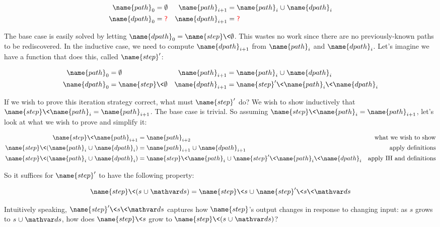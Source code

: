 \begin{align*}
  \name{path}_0 &= \emptyset
  &
  \name{path}_{i+1} &= \name{path}_i \cup \name{dpath}_i
  \\
  \name{dpath}_0 &= \textsf{\color{red}?} & \name{dpath}_{i+1} &= \textsf{\color{red}?}
\end{align*}

\noindent
The base case is easily solved by letting $\name{dpath}_0 = \name{step}\<\emptyset$. This wastes no work since there are no previously-known paths to be rediscovered. In the inductive case, we need to compute $\name{dpath}_{i+1}$ from $\name{path}_i$ and $\name{dpath}_i$. Let's imagine we have a function that does this, called $\name{step}'$:

\begin{align*}
  \name{path}_0 &= \emptyset
  &
  \name{path}_{i+1} &= \name{path}_i \cup \name{dpath}_i\\
  \name{dpath}_0 &= \name{step}\<\emptyset
  &
  \name{dpath}_{i+1} &= \name{step}' \<\name{path}_i \<\name{dpath}_i
\end{align*}

\noindent
If we wish to prove this iteration strategy correct, what must $\name{step}'$ do?
%
We wish to show inductively that $\name{step}\<\name{path}_i = \name{path}_{i+1}$.
%
The base case is trivial. So assuming $\name{step}\<\name{path}_{i} = \name{path}_{i+1}$, let's look at what we wish to prove and simplify it:

\begin{align*}
  \name{step} \<\name{path}_{i+1}
  &=
  \name{path}_{i+2}
  & \text{what we wish to show}
  \\
  \name{step} \<(\name{path}_i \cup \name{dpath}_i)
  &=
  \name{path}_{i+1} \cup \name{dpath}_{i+1}
  & \text{apply definitions}
  \\
  \name{step} \<(\name{path}_i \cup \name{dpath}_i)
  &=
  \name{step} \<\name{path}_i \cup \name{step}' \<\name{path}_i \<\name{dpath}_i
  & \text{apply IH and definitions}
\end{align*}

\noindent
So it suffices for $\name{step}'$ to have the following property:

\nopagebreak[1]
\[
\name{step}\<(s \cup \ds) = \name{step}\<s \cup \name{step}' \<s \<\ds 
\]

\noindent
Intuitively speaking, $\name{step}' \<s \<\ds$ captures how $\name{step}$'s output changes in response to changing input: as $s$ grows to $s \cup \ds$, how does $\name{step}\<s$ grow to $\name{step}\<(s \cup \ds)$?

